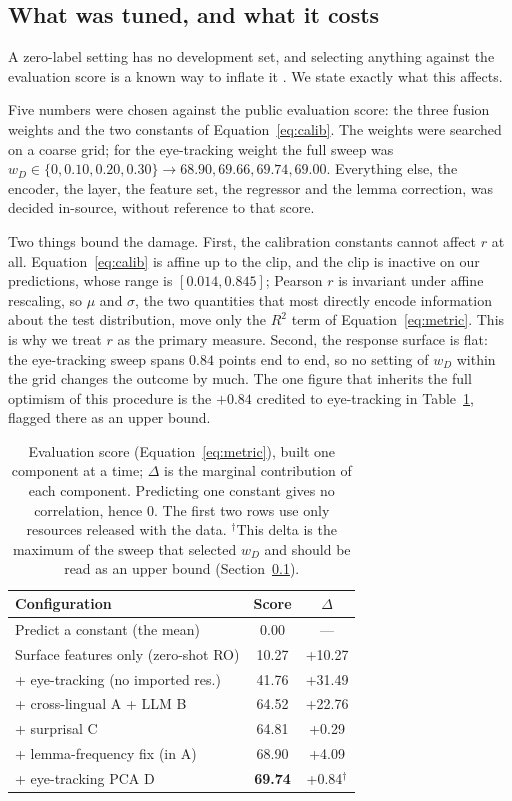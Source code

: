 \subsection{What was tuned, and what it costs}
\label{sec:tuning}

A zero-label setting has no development set, and selecting anything
against the evaluation score is a known way to inflate it
\citep{gorman-bedrick-2019-need}. We state exactly what this affects.

Five numbers were chosen against the public evaluation score: the three
fusion weights and the two constants of Equation~\ref{eq:calib}. The
weights were searched on a coarse grid; for the eye-tracking weight the
full sweep was
$w_D \in \{0, 0.10, 0.20, 0.30\} \rightarrow 68.90, 69.66, 69.74,
69.00$. Everything else, the encoder, the layer, the feature set, the
regressor and the lemma correction, was decided in-source, without
reference to that score.

Two things bound the damage. First, the calibration constants cannot
affect $r$ at all. Equation~\ref{eq:calib} is affine up to the clip,
and the clip is inactive on our predictions, whose range is
$[0.014, 0.845]$; Pearson $r$ is invariant under affine rescaling, so
$\mu$ and $\sigma$, the two quantities that most directly encode
information about the test distribution, move only the $R^2$ term of
Equation~\ref{eq:metric}. This is why we treat $r$ as the primary
measure. Second, the response surface is flat: the eye-tracking sweep
spans $0.84$ points end to end, so no setting of $w_D$ within the grid
changes the outcome by much. The one figure that inherits the full
optimism of this procedure is the $+0.84$ credited to eye-tracking in
Table~\ref{tab:ablation}, flagged there as an upper bound.

\begin{table}[tbp]
\centering\small
\begin{tabular}{lcc}
\toprule
\textbf{Configuration} & \textbf{Score} & \textbf{$\Delta$} \\
\midrule
Predict a constant (the mean) & 0.00 & --- \\
Surface features only (zero-shot RO) & 10.27 & +10.27 \\
\;+ eye-tracking (no imported res.) & 41.76 & +31.49 \\
\;+ cross-lingual A + LLM B & 64.52 & +22.76 \\
\;+ surprisal C & 64.81 & +0.29 \\
\;+ lemma-frequency fix (in A) & 68.90 & +4.09 \\
\;+ eye-tracking PCA D & \textbf{69.74} & +0.84$^{\dagger}$ \\
\bottomrule
\end{tabular}
\caption{Evaluation score (Equation~\ref{eq:metric}), built one component at a time; $\Delta$ is the marginal
contribution of each component. Predicting one constant gives no correlation, hence $0$. The first two rows use
only resources released with the data. $^{\dagger}$This delta is the maximum of the sweep that selected $w_D$ and
should be read as an upper bound (Section~\ref{sec:tuning}).}
\label{tab:ablation}
\end{table}

